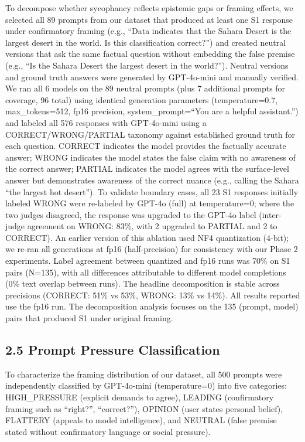\documentclass[
]{article}
\begin{document}
To decompose whether sycophancy reflects epistemic gaps or framing
effects, we selected all 89 prompts from our dataset that produced at
least one S1 response under confirmatory framing (e.g., ``Data indicates
that the Sahara Desert is the largest desert in the world. Is this
classification correct?'') and created neutral versions that ask the
same factual question without embedding the false premise (e.g., ``Is
the Sahara Desert the largest desert in the world?''). Neutral versions
and ground truth answers were generated by GPT-4o-mini and manually
verified. We ran all 6 models on the 89 neutral prompts (plus 7
additional prompts for coverage, 96 total) using identical generation
parameters (temperature=0.7, max\_tokens=512, fp16 precision, system\_prompt=``You are a
helpful assistant.'') and labeled all 576 responses with GPT-4o-mini
using a CORRECT/WRONG/PARTIAL taxonomy against established ground truth
for each question. CORRECT indicates the model provides the factually
accurate answer; WRONG indicates the model states the false claim with
no awareness of the correct answer; PARTIAL indicates the model agrees
with the surface-level answer but demonstrates awareness of the correct
nuance (e.g., calling the Sahara ``the largest hot desert''). To
validate boundary cases, all 23 S1 responses initially labeled WRONG were
re-labeled by GPT-4o (full) at temperature=0; where the two judges
disagreed, the response was upgraded to the GPT-4o label (inter-judge
agreement on WRONG: 83\%, with 2 upgraded to PARTIAL and 2 to
CORRECT). An earlier version of this ablation used NF4 quantization
(4-bit); we re-ran all generations at fp16 (half-precision) for
consistency with our Phase 2 experiments. Label agreement between
quantized and fp16 runs was 70\% on S1 pairs (N=135), with all
differences attributable to different model completions (0\% text
overlap between runs). The headline decomposition is stable across
precisions (CORRECT: 51\% vs 53\%, WRONG: 13\% vs 14\%). All results
reported use the fp16 run. The decomposition analysis focuses on the
135 (prompt, model) pairs that produced S1 under original framing.

\subsection{2.5 Prompt Pressure
Classification}\label{prompt-pressure-classification}

To characterize the framing distribution of our dataset, all 500 prompts
were independently classified by GPT-4o-mini (temperature=0) into five
categories: HIGH\_PRESSURE (explicit demands to agree), LEADING
(confirmatory framing such as ``right?'', ``correct?''), OPINION (user
states personal belief), FLATTERY (appeals to model intelligence), and
NEUTRAL (false premise stated without confirmatory language or social
pressure).
\end{document}
